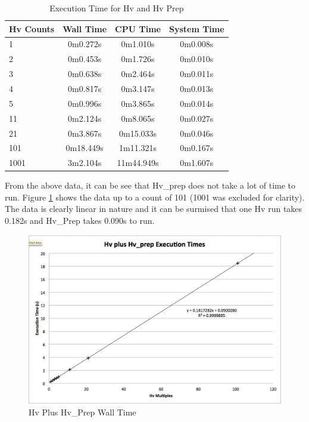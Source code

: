 \documentclass{revtex4-1}
\begin{document}
\begin{table}[h]
\caption{Execution Time for Hv and Hv Prep}
\begin{tabular}{l|c|c|c}
Hv Counts & Wall Time & CPU Time & System Time \\
\hline
1 & 0m0.272s & 0m1.010s & 0m0.008s \\
2 & 0m0.453s & 0m1.726s & 0m0.010s \\
3 & 0m0.638s & 0m2.464s & 0m0.011s \\
4 & 0m0.817s & 0m3.147s & 0m0.013s \\
5 & 0m0.996s & 0m3.865s & 0m0.014s \\
11 & 0m2.124s & 0m8.065s & 0m0.027s \\
21 & 0m3.867s & 0m15.033s & 0m0.046s \\
101 & 0m18.449s & 1m11.321s & 0m0.167s \\
1001 & 3m2.104s & 11m44.949s & 0m1.607s
\end{tabular}
\label{table:HvExecTime}
\end{table}

From the above data, it can be see that Hv\_prep does not take a lot of time to run. Figure \ref{Fig:HvHvPrepExecTime} shows the data up to a count of 101 (1001 was excluded for clarity). The data is clearly linear in nature and it can be surmised that one Hv run takes 0.182s and Hv\_Prep takes 0.090s to run.

\begin{figure}[h]
\includegraphics[width=\textwidth,keepaspectratio]{../../Hv-calculators/linRotor/cartSphBasis/Hv-calc/HvHv_prepTimeGraph.png}
\caption{Hv Plus Hv\_Prep Wall Time}
\label{Fig:HvHvPrepExecTime}
\end{figure}
\end{document}
